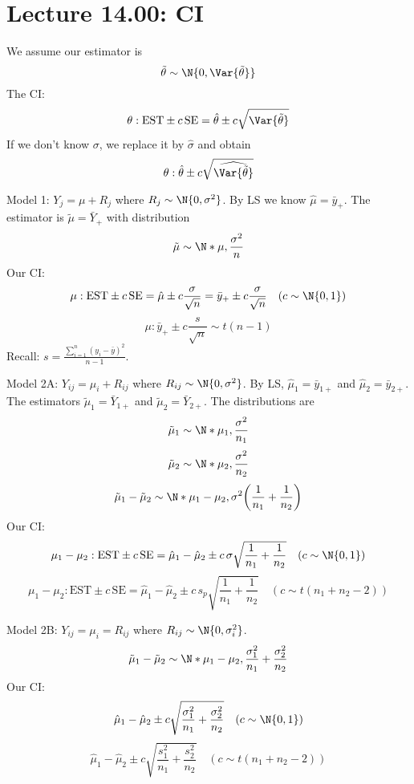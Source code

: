 \section{Lecture 14.00: CI}
We assume our estimator is
\[ \tilde{\theta}\sim \N{0,\Var{\tilde{\theta}}} \]
The CI\@:
\[ \theta:\text{EST}\pm c\,\text{SE}=\hat{\theta}\pm c\sqrt{\Var{\tilde{\theta}}} \]
If we don't know $ \sigma $, we replace it by $ \hat{\sigma} $
and obtain
\[ \theta:\hat{\theta}\pm c\sqrt{\widehat{\Var{\tilde{\theta}}}} \]
\begin{Example}{}{}
    Model 1: $ Y_{j}=\mu+R_j $ where $ R_j \sim \N{0,\sigma^2} $.
    By LS we know $ \hat{\mu}=\bar{y}_+ $. The estimator is $ \tilde{\mu}=\bar{Y}_+ $
    with distribution
    \[ \tilde{\mu} \sim \N*{\mu,\frac{\sigma^2}{n}} \]
    Our CI\@:
    \[ \mu:\text{EST}\pm c\,\text{SE}=\hat{\mu}\pm c\frac{\sigma}{\sqrt{n}}
        =\bar{y}_+\pm c \frac{\sigma}{\sqrt{n}}\quad (c \sim \N{0,1})  \]
    \[ \mu:\bar{y}_+ \pm c \frac{s}{\sqrt{n}}\sim t(n-1)  \]
    Recall: $ \displaystyle s=\frac{\sum_{i=1}^{n} (y_i-\bar{y})^2}{n-1} $.
\end{Example}
\begin{Example}{}{}
    Model 2A\@: $ Y_{ij} =\mu_i+R_{ij} $ where $ R_{ij}\sim \N{0,\sigma^2} $.
    By LS, $ \hat{\mu}_1=\bar{y}_{1+} $ and $ \hat{\mu}_2=\bar{y}_{2+} $.
    The estimators $ \tilde{\mu}_1=\bar{Y}_{1+} $ and $ \tilde{\mu}_2=\bar{Y}_{2+} $.
    The distributions are
    \[ \tilde{\mu}_1 \sim \N*{\mu_1,\frac{\sigma^2}{n_1} } \]
    \[ \tilde{\mu}_2 \sim \N*{\mu_2,\frac{\sigma^2}{n_2} } \]
    \[ \tilde{\mu}_1-\tilde{\mu}_2
        \sim \N*{\mu_1-\mu_2,\sigma^2\biggl(\frac{1}{n_1}+\frac{1}{n_2}\biggr)} \]
    Our CI\@:
    \[ \mu_1-\mu_2:\text{EST}\pm c\,\text{SE}
        =\hat{\mu}_1-\hat{\mu}_2\pm c\,\sigma\sqrt{\frac{1}{n_1}+\frac{1}{n_2} }
        \quad(c \sim \N{0,1}) \]
    \[ \mu_1-\mu_2:\text{EST}\pm c\,\text{SE}
        =\hat{\mu}_1-\hat{\mu}_2\pm c\, s_p\sqrt{\frac{1}{n_1}+\frac{1}{n_2} }
        \quad(c \sim t(n_1+n_2-2)) \]
\end{Example}
\begin{Example}{}{}
    Model 2B\@: $ Y_{ij}=\mu_i=R_{ij} $ where $ R_{ij}\sim \N{0,\sigma_i^2} $.
    \[ \tilde{\mu}_1-\tilde{\mu}_2
        \sim \N*{\mu_1-\mu_2,\frac{\sigma_1^2}{n_1} +\frac{\sigma_2^2}{n_2} } \]
    Our CI\@:
    \[ \hat{\mu}_1-\hat{\mu}_2\pm c\sqrt{\frac{\sigma_1^2}{n_1} +\frac{\sigma_2^2}{n_2}}
        \quad(c \sim \N{0,1}) \]
    \[ \hat{\mu}_1-\hat{\mu}_2\pm c\sqrt{\frac{s_1^2}{n_1} +\frac{s_2^2}{n_2}}
        \quad(c \sim t(n_1+n_2-2)) \]
\end{Example}
